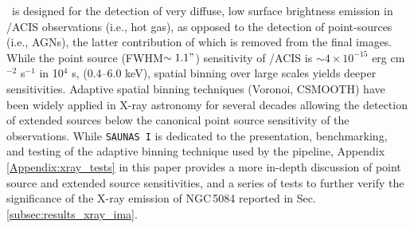 \documentclass[modern]{CORE-AAS/aastex631}
\begin{document}
\SAUNAS\ is designed for the detection of very diffuse, low surface brightness emission in \Chandra/ACIS observations (i.e., hot gas), as opposed to the detection of point-sources (i.e., AGNs), the latter contribution of which is removed from the final images. While the point source (FWHM$\sim1.1"$) sensitivity of \Chandra/ACIS is $\sim4\times10^{-15}$ erg cm$^{-2}$ s$^{-1}$ in 10$^4$ s, (0.4--6.0 keV), spatial binning over large scales yields deeper sensitivities.
Adaptive spatial binning techniques (Voronoi, CSMOOTH) \citep{cappellari+2003mnras342_345, ebeling+2006mnras368_65} have been widely applied in X-ray astronomy for several decades \citep[see][and references therein]{ebeling+2007apj661_33,gonzalezmartin+2009aap506_1107,broos+2010apj714_1582, ebeling+2010mnras407_83, xue+2011apj195_10, hodgeskluck+2012apj746_167, wang+2024apj962_188} allowing the detection of extended sources below the canonical point source sensitivity of the observations. While \texttt{SAUNAS I} \citep{borlaff+2024apj967_169} is dedicated to the presentation, benchmarking, and testing of the adaptive binning technique used by the pipeline, Appendix \ref{Appendix:xray_tests} in this paper provides a more in-depth discussion of point source and extended source sensitivities, and a series of tests to further verify the significance of the X-ray emission of NGC\,5084 reported in Sec.\,\ref{subsec:results_xray_ima}.
\end{document}

